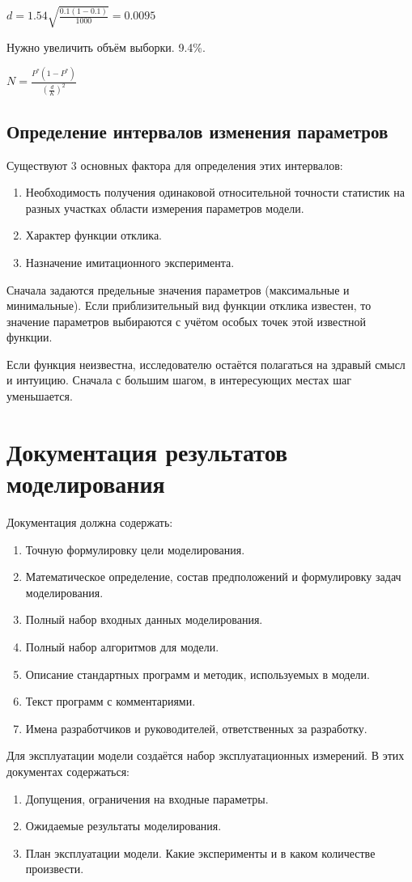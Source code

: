 \documentclass[12pt, russian, oneside, article]{ncc}
\begin{document}
$d = 1.54 \sqrt{\frac{0.1(1-0.1)}{1000}} = 0.0095$

Нужно увеличить объём выборки. 9.4\%.

$N = \frac{P^*(1-P^*)}{(\frac{d}{K})^2}$
\subsection{Определение интервалов изменения параметров}
\label{sec-7_6}


Существуют 3 основных фактора для определения этих интервалов:
\begin{enumerate}
\item Необходимость получения одинаковой относительной точности статистик на разных участках области измерения параметров модели.
\item Характер функции отклика.
\item Назначение имитационного эксперимента.
\end{enumerate}

Сначала задаются предельные значения параметров (максимальные и минимальные). Если приблизительный вид функции отклика известен, то значение параметров выбираются с учётом особых точек этой известной функции.

Если функция неизвестна, исследователю остаётся полагаться на здравый смысл и интуицию. Сначала с большим шагом, в интересующих местах шаг уменьшается.
\section{Документация результатов моделирования}
\label{sec-8}


Документация должна содержать:
\begin{enumerate}
\item Точную формулировку цели моделирования.
\item Математическое определение, состав предположений и формулировку задач моделирования.
\item Полный набор входных данных моделирования.
\item Полный набор алгоритмов для модели.
\item Описание стандартных программ и методик, используемых в модели.
\item Текст программ с комментариями.
\item Имена разработчиков и руководителей, ответственных за разработку.
\end{enumerate}

Для эксплуатации модели создаётся набор эксплуатационных измерений. В этих документах содержаться:
\begin{enumerate}
\item Допущения, ограничения на входные параметры.
\item Ожидаемые результаты моделирования.
\item План эксплуатации модели. Какие эксперименты и в каком количестве произвести.
\end{enumerate}
\end{document}
